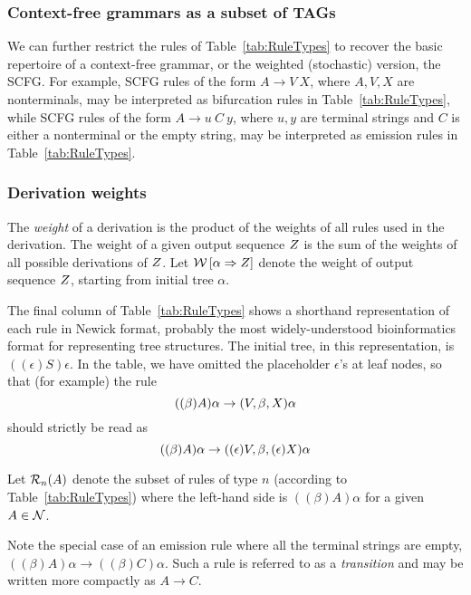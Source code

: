 \documentclass[10pt]{article}
\newcommand{\tabnum}[1]{\ref{tab:#1}}
\newcommand{\tabref}[1]{Table~\tabnum{#1}}
\begin{document}
\subsubsection{Context-free grammars as a subset of TAGs}

We can further restrict the rules of \tabref{RuleTypes} to recover the basic repertoire of a context-free grammar,
or the weighted (stochastic) version, the SCFG.
For example, SCFG rules of the form $A \to V\ X$, where $A,V,X$ are nonterminals,
may be interpreted as bifurcation rules in \tabref{RuleTypes},
while SCFG rules of the form $A \to u\ C\ y$, where $u,y$ are terminal strings and $C$ is either a nonterminal or the empty string,
may be interpreted as emission rules in \tabref{RuleTypes}.

\subsubsection{Derivation weights}

\newcommand\seqweight[2]{\weight \left[ {#1} \Rightarrow {#2} \right]}

The {\em weight} of a derivation is the product of the weights of all rules used in the derivation.
The weight of a given output sequence $Z$ is the sum of the weights of all possible derivations of $Z$.
Let $\seqweight{\alpha}{\outseq}$ denote the weight of output sequence $Z$,
starting from initial tree $\alpha$.

The final column of \tabref{RuleTypes} shows a shorthand representation of each rule in Newick format,
probably the most widely-understood bioinformatics format for representing tree structures.
The initial tree, in this representation, is $((\epsilon)S)\epsilon$.
In the table, we have omitted the placeholder $\epsilon$'s at leaf nodes,
so that (for example) the rule
\[
((\beta)A)\alpha \to (V,\beta,X)\alpha
\]
should strictly be read as
\[
((\beta)A)\alpha \to ((\epsilon)V,\beta,(\epsilon)X)\alpha
\]

Let ${\cal R}_{n}(A)$ denote the subset of rules of type $n$ (according to \tabref{RuleTypes})
where the left-hand side is $((\beta)A)\alpha$ for a given $A \in {\cal N}$.

Note the special case of an emission rule where all the terminal strings are empty,
$((\beta)A)\alpha \to ((\beta)C)\alpha$.
Such a rule is referred to as a {\em transition} and may be written more compactly as $A \to C$.
\end{document}
